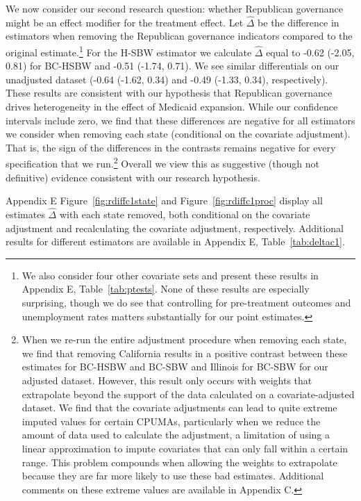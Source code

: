 \documentclass{article}
\begin{document}
We now consider our second research question: whether Republican governance might be an effect modifier for the treatment effect. Let $\hat{\Delta}$ be the difference in estimators when removing the Republican governance indicators compared to the original estimate.\footnote{We also consider four other covariate sets and present these results in Appendix E, Table~\ref{tab:ptests}. None of these results are especially surprising, though we do see that controlling for pre-treatment outcomes and unemployment rates matters substantially for our point estimates.} For the H-SBW estimator we calculate $\hat{\Delta}$ equal to -0.62 (-2.05, 0.81) for BC-HSBW and -0.51 (-1.74, 0.71). We see similar differentials on our unadjusted dataset (-0.64 (-1.62, 0.34) and -0.49 (-1.33, 0.34), respectively). These results are consistent with our hypothesis that Republican governance drives heterogeneity in the effect of Medicaid expansion. While our confidence intervals include zero, we find that these differences are negative for all estimators we consider when removing each state (conditional on the covariate adjustment). That is, the sign of the differences in the contrasts remains negative for every specification that we run.\footnote{When we re-run the entire adjustment procedure when removing each state, we find that removing California results in a positive contrast between these estimates for BC-HSBW and BC-SBW and Illinois for BC-SBW for our adjusted dataset. However, this result only occurs with weights that extrapolate beyond the support of the data calculated on a covariate-adjusted dataset. We find that the covariate adjustments can lead to quite extreme imputed values for certain CPUMAs, particularly when we reduce the amount of data used to calculate the adjustment, a limitation of using a linear approximation to impute covariates that can only fall within a certain range. This problem compounds when allowing the weights to extrapolate because they are far more likely to use these bad estimates. Additional comments on these extreme values are available in Appendix C.} Overall we view this as suggestive (though not definitive) evidence consistent with our research hypothesis.

Appendix E Figure~\ref{fig:rdiffc1state} and Figure~\ref{fig:rdiffc1proc} display all estimates $\hat{\Delta}$ with each state removed, both conditional on the covariate adjustment and recalculating the covariate adjustment, respectively. Additional results for different estimators are available in Appendix E, Table~\ref{tab:deltac1}.
\end{document}
